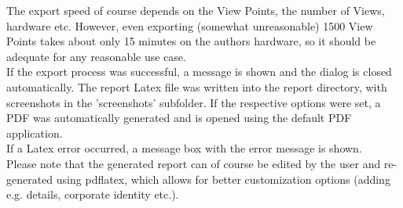 The export speed of course depends on the View Points, the number of Views, hardware etc. However, even exporting (somewhat unreasonable) 1500 View Points takes about only 15 minutes on the authors hardware, so it should be adequate for any reasonable use case. \\

If the export process was successful, a message is shown and the dialog is closed automatically. The report Latex file was written into the report directory, with screenshots in the 'screenshots' subfolder. If the respective options were set, a PDF was automatically generated and is opened using the default PDF application. \\

If a Latex error occurred, a message box with the error message is shown. \\

Please note that the generated report can of course be edited by the user and re-generated using pdflatex, which allows for better customization options (adding e.g. details, corporate identity etc.).

